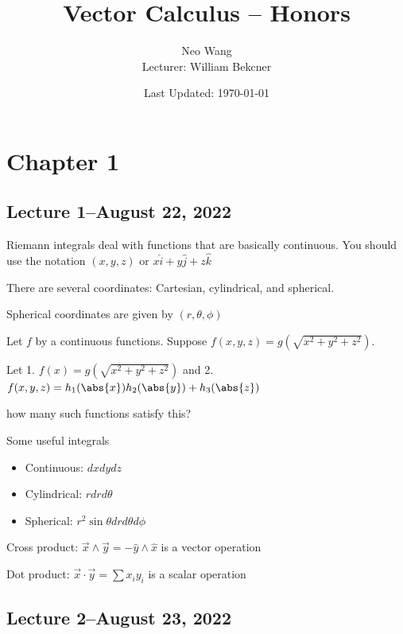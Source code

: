 \documentclass{scrreprt}
\title{Vector Calculus -- Honors}
\author{Neo Wang\\ Lecturer: William Bekcner}
\date{Last Updated: \today}
\begin{document}
\maketitle


\chapter{Chapter 1}

\section{Lecture 1--August 22, 2022}

Riemann integrals deal with functions that are basically continuous.
You should use the notation $(x, y, z)$ or $x\hat{i} + y\hat{j} + z\hat{k}$

There are several coordinates: Cartesian, cylindrical, and spherical.

Spherical coordinates are given by $(r, \theta, \phi)$

\begin{example}
	Let $f$ by a continuous functions. Suppose $f(x,y,z)=g(\sqrt{x^2+y^2+z^2})$.

	Let 1. $f(x)=g(\sqrt{x^2+y^2+z^2})$
	and 2. $f(x, y, z) = h_1(\abs{x})h_2(\abs{y})+h_3(\abs{z})$

	how many such functions satisfy this?
\end{example}

\begin{definition}
	Some useful integrals
	\begin{itemize}
		\item Continuous: $dxdydz$
		\item Cylindrical: $rdrd\theta$
		\item Spherical: $r^2\sin\theta drd\theta d\phi$
	\end{itemize}
\end{definition}

\begin{definition}[Vectors]
	Cross product: $\vec{x}\wedge \vec{y} = -\hat{y} \wedge \hat{x}$ is a vector operation

	Dot product: $\vec{x}\cdot \vec{y} = \sum x_i y_i$ is a scalar operation
\end{definition}

\section{Lecture 2--August 23, 2022}
\end{document}
